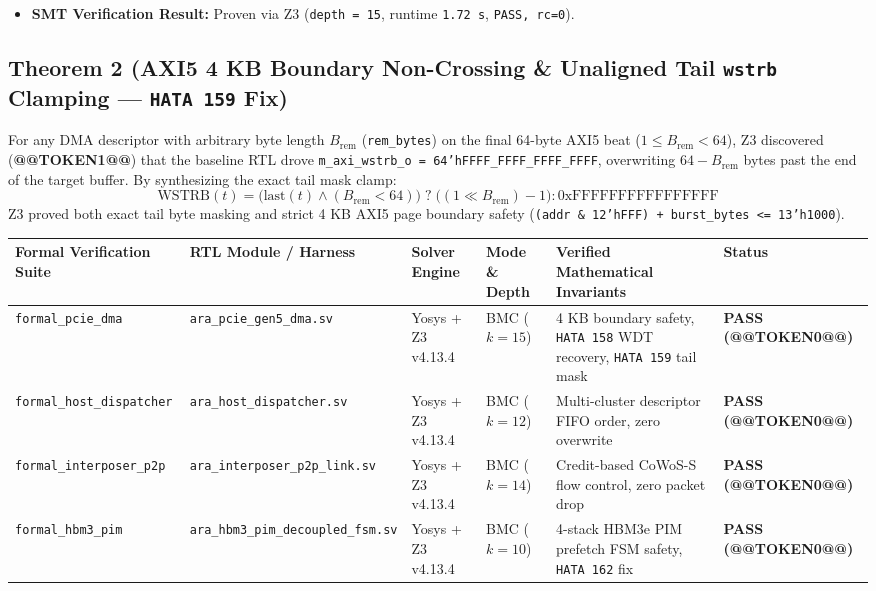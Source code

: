 \documentclass[journal,10pt,twocolumn]{IEEEtran}
\begin{document}
\begin{itemize}
  \item \textbf{SMT Verification Result:} Proven via Z3 (\texttt{depth = 15}, runtime \texttt{1.72 s}, \texttt{PASS, rc=0}).
\end{itemize}

\subsection{Theorem 2 (AXI5 4 KB Boundary Non-Crossing \& Unaligned Tail \texttt{wstrb} Clamping — \texttt{HATA 159} Fix)}
For any DMA descriptor with arbitrary byte length $B_{\mathrm{rem}}$ (\texttt{rem\_bytes}) on the final 64-byte AXI5 beat ($1 \le B_{\mathrm{rem}} < 64$), Z3 discovered (\textbf{@@TOKEN1@@}) that the baseline RTL drove \texttt{m\_axi\_wstrb\_o = 64'hFFFF\_FFFF\_FFFF\_FFFF}, overwriting $64 - B_{\mathrm{rem}}$ bytes past the end of the target buffer. By synthesizing the exact tail mask clamp:
$$\mathrm{WSTRB}(t) = \big(\mathrm{last}(t) \wedge (B_{\mathrm{rem}} < 64)\big) \;?\; \big((1 \ll B_{\mathrm{rem}}) - 1\big) : \mathrm{0xFFFFFFFFFFFFFFFF}$$
Z3 proved both exact tail byte masking and strict 4 KB AXI5 page boundary safety (\texttt{(addr \& 12'hFFF) + burst\_bytes <= 13'h1000}).

\begin{table}[htbp]
\centering\footnotesize
\begin{tabular}{p{} p{} p{} p{} p{} p{}}
\toprule
\textbf{Formal Verification Suite} & \textbf{RTL Module / Harness} & \textbf{Solver Engine} & \textbf{Mode \& Depth} & \textbf{Verified Mathematical Invariants} & \textbf{Status} \\
\midrule
\texttt{formal\_pcie\_dma} & \texttt{ara\_pcie\_gen5\_dma.sv} & Yosys + Z3 v4.13.4 & BMC ($k=15$) & 4 KB boundary safety, \texttt{HATA 158} WDT recovery, \texttt{HATA 159} tail mask & \textbf{PASS (@@TOKEN0@@)} \\
\texttt{formal\_host\_dispatcher} & \texttt{ara\_host\_dispatcher.sv} & Yosys + Z3 v4.13.4 & BMC ($k=12$) & Multi-cluster descriptor FIFO order, zero overwrite & \textbf{PASS (@@TOKEN0@@)} \\
\texttt{formal\_interposer\_p2p} & \texttt{ara\_interposer\_p2p\_link.sv} & Yosys + Z3 v4.13.4 & BMC ($k=14$) & Credit-based CoWoS-S flow control, zero packet drop & \textbf{PASS (@@TOKEN0@@)} \\
\texttt{formal\_hbm3\_pim} & \texttt{ara\_hbm3\_pim\_decoupled\_fsm.sv} & Yosys + Z3 v4.13.4 & BMC ($k=10$) & 4-stack HBM3e PIM prefetch FSM safety, \texttt{HATA 162} fix & \textbf{PASS (@@TOKEN0@@)} \\
\bottomrule
\end{tabular}
\vspace{4pt}
\end{table}
\end{document}
